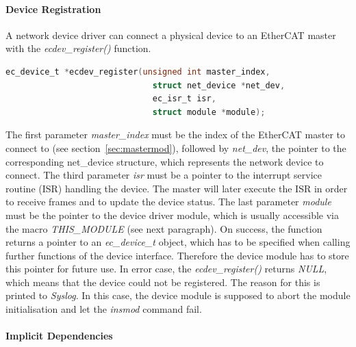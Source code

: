 \documentclass[a4paper,12pt,BCOR6mm,bibtotoc,idxtotoc]{scrbook}
\begin{document}
\paragraph{Device Registration}

A network device driver can connect a physical device to an EtherCAT
master with the \textit{ecdev\_register()} function.

\begin{lstlisting}[gobble=2,language=C]
  ec_device_t *ecdev_register(unsigned int master_index,
                              struct net_device *net_dev,
                              ec_isr_t isr,
                              struct module *module);
\end{lstlisting}

The first parameter \textit{master\_index} must be the index of the
EtherCAT master to connect to (see section~\ref{sec:mastermod}),
followed by \textit{net\_dev}, the pointer to the corresponding
net\_device structure, which represents the network device to connect.
The third parameter \textit{isr} must be a pointer to the interrupt
service routine (ISR) handling the device. The master will
later execute the ISR in order to receive frames and to update the
device status. The last parameter \textit{module} must be the pointer
to the device driver module, which is usually accessible via the macro
\textit{THIS\_MODULE} (see next paragraph). On success, the function
returns a pointer to an \textit{ec\_device\_t} object, which has to be
specified when calling further functions of the device interface.
Therefore the device module has to store this pointer for future use.
In error case, the \textit{ecdev\_register()} returns \textit{NULL},
which means that the device could not be registered.  The reason for
this is printed to \textit{Syslog}. In this case, the
device module is supposed to abort the module initialisation and let
the \textit{insmod} command fail.

\paragraph{Implicit Dependencies}
\end{document}
